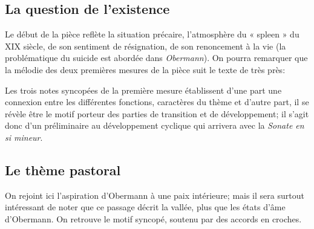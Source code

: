 \documentclass[11pt,a4paper]{scrartcl}
\begin{document}
\subsection{La question de l'existence}

Le début de la pièce reflète la situation précaire, l'atmosphère du « spleen » du XIX\ieme{} siècle, de son sentiment de résignation, de son renoncement à la vie (la problématique du suicide est abordée dans \emph{Obermann}). On pourra remarquer que la mélodie des deux premières mesures de la pièce suit le texte de très près:\\

\begin{center}
\end{center}

Les trois notes syncopées de la première mesure établissent d'une part une connexion entre les différentes
fonctions, caractères du thème et d'autre part, il se révèle être le motif porteur des parties de transition et de
développement; il s'agit donc d'un préliminaire au développement cyclique qui arrivera avec la \emph{Sonate en si mineur}.

\subsection{Le thème pastoral}

On rejoint ici l'aspiration d'Obermann à une paix intérieure; mais il sera surtout intéressant de noter que ce
passage décrit la vallée, plus que les états d'âme d'Obermann. On retrouve le motif syncopé, soutenu par 
des accords en croches. 
\end{document}
